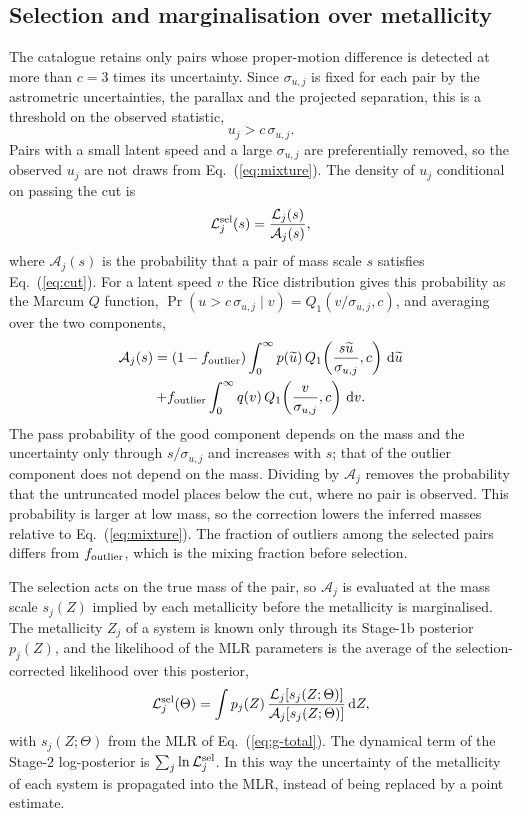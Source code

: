 \documentclass{aa}
\newcommand{\dd}{\,\mathrm{d}}
\begin{document}
\subsection{Selection and marginalisation over metallicity}\label{sec:selection}
The catalogue retains only pairs whose proper-motion difference is detected at more than $c=3$ times its uncertainty. Since $\sigma_{u,j}$ is fixed for each pair by the astrometric uncertainties, the parallax and the projected separation, this is a threshold on the observed statistic,
\begin{equation}
 u_j>c\,\sigma_{u,j}.
 \label{eq:cut}
\end{equation}
Pairs with a small latent speed and a large $\sigma_{u,j}$ are preferentially removed, so the observed $u_j$ are not draws from Eq.~(\ref{eq:mixture}). The density of $u_j$ conditional on passing the cut is
\begin{equation}
 \mathcal L^{\rm sel}_j(s)=\frac{\mathcal L_j(s)}{\mathcal A_j(s)},
 \label{eq:truncated}
\end{equation}
where $\mathcal A_j(s)$ is the probability that a pair of mass scale $s$ satisfies Eq.~(\ref{eq:cut}). For a latent speed $v$ the Rice distribution gives this probability as the Marcum $Q$ function, $\Pr(u>c\,\sigma_{u,j}\mid v)=Q_1(v/\sigma_{u,j},c)$, and averaging over the two components,
\begin{multline}
 \mathcal A_j(s)=(1-f_{\rm outlier})\int_0^{\infty}p(\widetilde u)\,Q_1\!\left(\frac{s\widetilde u}{\sigma_{u,j}},c\right)\dd\widetilde u\\+f_{\rm outlier}\int_0^{\infty}q(v)\,Q_1\!\left(\frac{v}{\sigma_{u,j}},c\right)\dd v .
 \label{eq:pass}
\end{multline}
The pass probability of the good component depends on the mass and the uncertainty only through $s/\sigma_{u,j}$ and increases with $s$; that of the outlier component does not depend on the mass. Dividing by $\mathcal A_j$ removes the probability that the untruncated model places below the cut, where no pair is observed. This probability is larger at low mass, so the correction lowers the inferred masses relative to Eq.~(\ref{eq:mixture}). The fraction of outliers among the selected pairs differs from $f_{\rm outlier}$, which is the mixing fraction before selection.

The selection acts on the true mass of the pair, so $\mathcal A_j$ is evaluated at the mass scale $s_j(Z)$ implied by each metallicity before the metallicity is marginalised. The metallicity $Z_j$ of a system is known only through its Stage-1b posterior $p_j(Z)$, and the likelihood of the MLR parameters is the average of the selection-corrected likelihood over this posterior,
\begin{equation}
 \mathcal L^{\rm sel}_j(\Theta)=\int p_j(Z)\,\frac{\mathcal L_j[s_j(Z;\Theta)]}{\mathcal A_j[s_j(Z;\Theta)]}\dd Z,
 \label{eq:marginal}
\end{equation}
with $s_j(Z;\Theta)$ from the MLR of Eq.~(\ref{eq:g-total}). The dynamical term of the Stage-2 log-posterior is $\sum_j\ln\mathcal L^{\rm sel}_j$. In this way the uncertainty of the metallicity of each system is propagated into the MLR, instead of being replaced by a point estimate.
\end{document}
